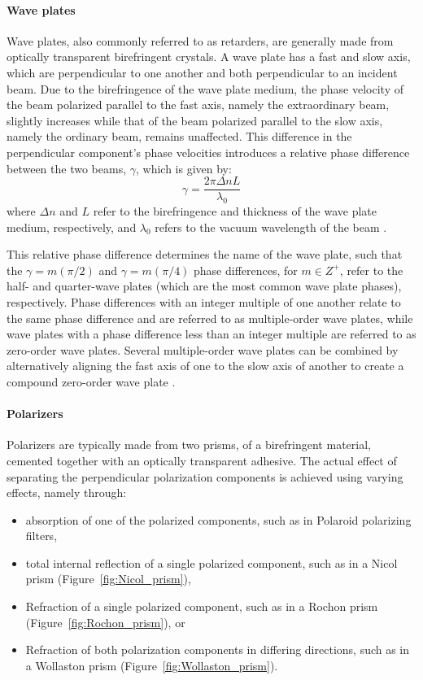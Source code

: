 \paragraph{Wave plates}
Wave plates, also commonly referred to as retarders, are generally made from optically transparent birefringent crystals. A wave plate has a fast and slow axis, which are perpendicular to one another and both perpendicular to an incident beam. Due to the birefringence of the wave plate medium, the phase velocity of the beam polarized parallel to the fast axis, namely the extraordinary beam, slightly increases while that of the beam polarized parallel to the slow axis, namely the ordinary beam, remains unaffected. This difference in the perpendicular component's phase velocities introduces a relative phase difference between the two beams, $\gamma$, which is given by:
\begin{equation}
    \gamma = \frac{2 \pi \Delta n L}{\lambda_{0}}
\end{equation}
where $\Delta n$ and $L$ refer to the birefringence and thickness of the wave plate medium, respectively, and $\lambda_{0}$ refers to the vacuum wavelength of the beam \citep{Hecht_optics}.

This relative phase difference determines the name of the wave plate, such that the $\gamma = m(\pi/2) $ and $\gamma = m(\pi/4)$ phase differences, for $m \in Z^{+}$, refer to the half- and quarter-wave plates (which are the most common wave plate phases), respectively. Phase differences with an integer multiple of one another relate to the same phase difference and are referred to as multiple-order wave plates, while wave plates with a phase difference less than an integer multiple are referred to as zero-order wave plates. Several multiple-order wave plates can be combined by alternatively aligning the fast axis of one to the slow axis of another to create a compound zero-order wave plate \citep{Hale_birefringence}.

\paragraph{Polarizers}\label{par:polarizer}
Polarizers are typically made from two prisms, of a birefringent material, cemented together with an optically transparent adhesive. The actual effect of separating the perpendicular polarization components is achieved using varying effects, namely through:
\begin{itemize}
    \item absorption of one of the polarized components, such as in Polaroid polarizing filters,
    \item total internal reflection of a single polarized component, such as in a Nicol prism (Figure~\ref{fig:Nicol_prism}),
    \item Refraction of a single polarized component, such as in a Rochon prism (Figure~\ref{fig:Rochon_prism}), or
    \item Refraction of both polarization components in differing directions, such as in a Wollaston prism (Figure~\ref{fig:Wollaston_prism}).
\end{itemize}

